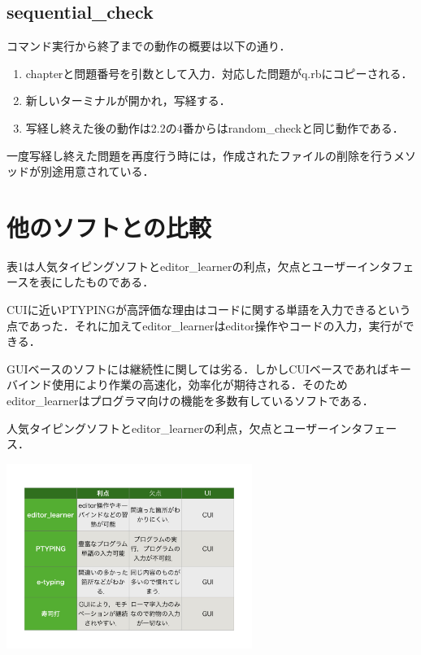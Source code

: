 \documentclass[a4j,twocolumn]{jsarticle}
\def\tightlist{\itemsep1pt\parskip0pt\parsep0pt}
\begin{document}
\subsection{sequential\_check}
コマンド実行から終了までの動作の概要は以下の通り．
\begin{enumerate}
\def\labelenumi{\arabic{enumi}.}
\tightlist
\item
chapterと問題番号を引数として入力．対応した問題がq.rbにコピーされる．
\item
新しいターミナルが開かれ，写経する．
\item
写経し終えた後の動作は2.2の4番からはrandom\_checkと同じ動作である．
\end{enumerate}
一度写経し終えた問題を再度行う時には，作成されたファイルの削除を行うメソッドが別途用意されている．

\section{他のソフトとの比較}

表1は人気タイピングソフトとeditor\_learnerの利点，欠点とユーザーインタフェースを表にしたものである．

CUIに近いPTYPINGが高評価な理由はコードに関する単語を入力できるという点であった．それに加えてeditor\_learnerはeditor操作やコードの入力，実行ができる．

GUIベースのソフトには継続性に関しては劣る．しかしCUIベースであればキーバインド使用により作業の高速化，効率化が期待される．そのためeditor\_learnerはプログラマ向けの機能を多数有しているソフトである．
\begin{table}[h]
\begin{center}
\caption{人気タイピングソフトとeditor\_learnerの利点，欠点とユーザーインタフェース．\label{sample}}
\vspace{-0.5zh}
\centering\includegraphics[width=80mm]{../handout/ok/ok.jpeg}
\end{center}

\label{fig:This}
\end{table}
\vspace{-3zh}
\end{document}
